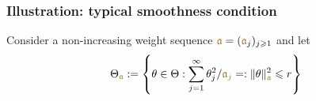 \frametitle{{\rudicolor Illustration:} typical smoothness condition}
Consider a non-increasing weight sequence
$\wSo=({\wSo_j})_{j\geq1}$ and let 
\[\cwSo :=\set{\So\in \cSo: \sum_{j=1}^\infty
  \theta_j^2/{\rudicolor\wSo_j}=:\normV{\So}_{\wSo}^2 \leq\rSo} \]
